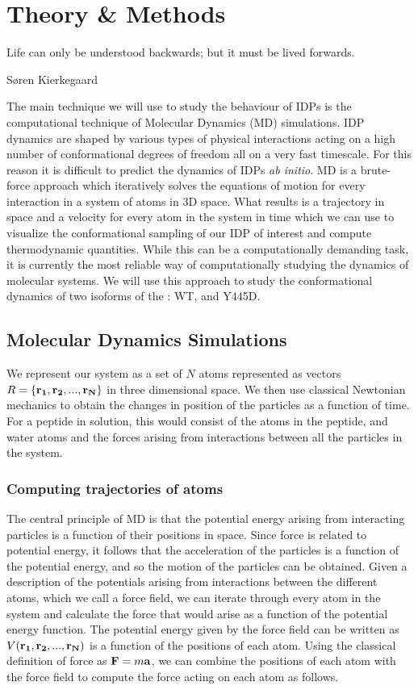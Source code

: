 \chapter{Theory \& Methods}
\epigraph{Life can only be understood backwards; but it must be lived forwards.}{S{\o}ren Kierkegaard}

The main technique we will use to study the behaviour of IDPs is the computational technique of Molecular Dynamics (MD) simulations. IDP dynamics are shaped by various types of physical interactions acting on a high number of conformational degrees of freedom all on a very fast timescale. For this reason it is difficult to predict the dynamics of IDPs {\it ab initio}. MD is a brute-force approach which iteratively solves the equations of motion for every interaction in a system of atoms in 3D space.  What results is a trajectory in space and a velocity for every atom in the system in time which we can use to visualize the conformational sampling of our IDP of interest and compute thermodynamic quantities. While this can be a computationally demanding task, it is currently the most reliable way of computationally studying the dynamics of molecular systems. We will use this approach to study the conformational dynamics of two isoforms of the \gct{}: WT, and Y445D.

\section{Molecular Dynamics Simulations}

We represent our system as a set of $N$ atoms represented as  vectors $R = \{\mathbf{r_1}, \mathbf{r_2}, ... , \mathbf{r_N}\}$ in three dimensional space. We then use classical Newtonian mechanics to obtain the changes in position of the particles as a function of time. For a peptide in solution, this would consist of the atoms in the peptide, and water atoms and the forces arising from interactions between all the particles in the system. 

\subsection{Computing trajectories of atoms}

The central principle of MD is that the potential energy arising from interacting particles is a function of their positions in space. Since force is related to potential energy, it follows that the acceleration of the particles is a function of the potential energy, and so the motion of the particles can be obtained. Given a description of the potentials arising from interactions between the different atoms, which we call a force field, we can iterate through every atom in the system and calculate the force that would arise as a function of the potential energy function. The potential energy given by the force field can be written as $V(\mathbf{r_1}, \mathbf{r_2}, ..., \mathbf{r_N})$ is a function of the positions of each atom. Using the classical definition of force as $\mathbf{F} = m\mathbf{a}$, we can combine the positions of each atom with the force field to compute the force acting on each atom as follows.  

